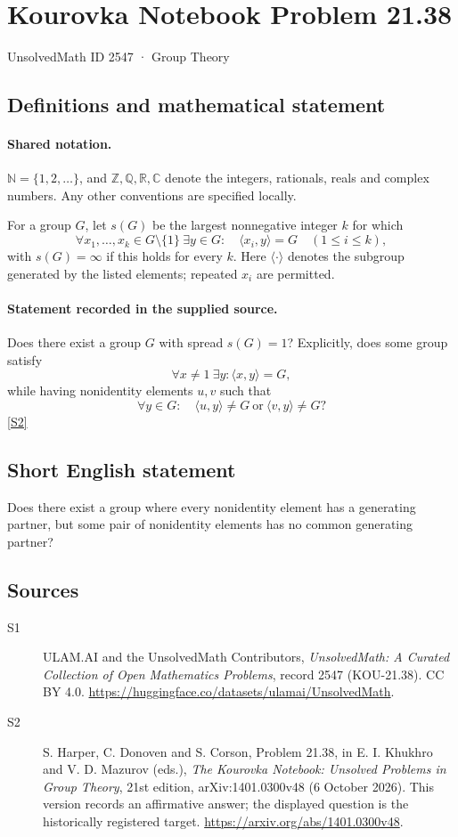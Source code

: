 \documentclass[11pt]{article}
\newcommand{\sref}[2]{\hyperlink{source:#1:#2}{[S#2]}}
\begin{document}
\setcounter{section}{2546}
\section{Kourovka Notebook Problem 21.38}\label{2547}
{\small\sffamily UnsolvedMath ID 2547 · Group Theory}
\subsection{Definitions and mathematical statement}

\paragraph{Shared notation.}$\mathbb N=\{1,2,\ldots\}$, and $\mathbb Z,\mathbb Q,\mathbb R,\mathbb C$ denote the integers, rationals, reals and complex numbers. Any other conventions are specified locally.


For a group $G$, let $s(G)$ be the largest nonnegative integer $k$ for which
\[
 \forall x_1,\ldots,x_k\in G\setminus\{1\}\ \exists y\in G:\quad
 \langle x_i,y\rangle=G\quad(1\leq i\leq k),
\]
with $s(G)=\infty$ if this holds for every $k$. Here $\langle\cdot\rangle$ denotes the subgroup generated by the listed elements; repeated $x_i$ are permitted.
\paragraph{Statement recorded in the supplied source.}
Does there exist a group $G$ with spread $s(G)=1$? Explicitly, does some group satisfy
\[
 \forall x\ne1\ \exists y:\langle x,y\rangle=G,
\]
while having nonidentity elements $u,v$ such that
\[
 \forall y\in G:\quad \langle u,y\rangle\ne G\ \text{or}\ \langle v,y\rangle\ne G?
\] \sref{2547}{2}
\subsection{Short English statement}
Does there exist a group where every nonidentity element has a generating partner, but some pair of nonidentity elements has no common generating partner?
\subsection{Sources}
\begin{description}
\item[\hypertarget{source:2547:1}{S1}] ULAM.AI and the UnsolvedMath Contributors, \emph{UnsolvedMath: A Curated Collection of Open Mathematics Problems}, record 2547 (KOU-21.38). CC BY 4.0. \url{https://huggingface.co/datasets/ulamai/UnsolvedMath}.
\item[\hypertarget{source:2547:2}{S2}] S. Harper, C. Donoven and S. Corson, Problem 21.38, in E. I. Khukhro and V. D. Mazurov (eds.), \emph{The Kourovka Notebook: Unsolved Problems in Group Theory}, 21st edition, arXiv:1401.0300v48 (6 October 2026). This version records an affirmative answer; the displayed question is the historically registered target. \url{https://arxiv.org/abs/1401.0300v48}.
\end{description}
\label{end:2547}
\end{document}
